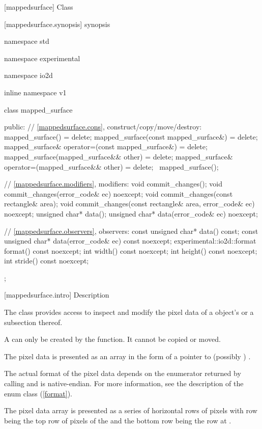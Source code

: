  [mappedsurface] {Class }

 [mappedsurface.synopsis] { synopsis}

\begin{codeblock}
namespace std { namespace experimental { namespace io2d { inline namespace v1 {
  class mapped_surface {
  public:
    // \ref{mappedsurface.cons}, construct/copy/move/destroy:
    mapped_surface() = delete;
    mapped_surface(const mapped_surface&) = delete;
    mapped_surface& operator=(const mapped_surface&) = delete;
    mapped_surface(mapped_surface&& other) = delete;
    mapped_surface& operator=(mapped_surface&& other) = delete;
    ~mapped_surface();
    
    // \ref{mappedsurface.modifiers}, modifiers:
    void commit_changes();
    void commit_changes(error_code& ec) noexcept;
    void commit_changes(const rectangle& area);
    void commit_changes(const rectangle& area, error_code& ec) noexcept;
    unsigned char* data();
    unsigned char* data(error_code& ec) noexcept;
    
    // \ref{mappedsurface.observers}, observers:
    const unsigned char* data() const;
    const unsigned char* data(error_code& ec) const noexcept;
    experimental::io2d::format format() const noexcept;
    int width() const noexcept;
    int height() const noexcept;
    int stride() const noexcept;
  };
} } } }
\end{codeblock}

 [mappedsurface.intro] { Description}

\pnum
{}
The  class provides access to inspect and modify the pixel data of a  object's \underlyingsurface or a subsection thereof.

\pnum
A  can only be created by the  function. It cannot be copied or moved.

\pnum
The pixel data is presented as an array in the form of a pointer to (possibly ) .

\pnum
The actual format of the pixel data depends on the  enumerator returned by calling  and is native-endian. For more information, see the description of the  enum class (\ref{format}).

\pnum
The pixel data array is presented as a series of horizontal rows of pixels with row  being the top row of pixels of the \underlyingsurface and the bottom row being the row at .

